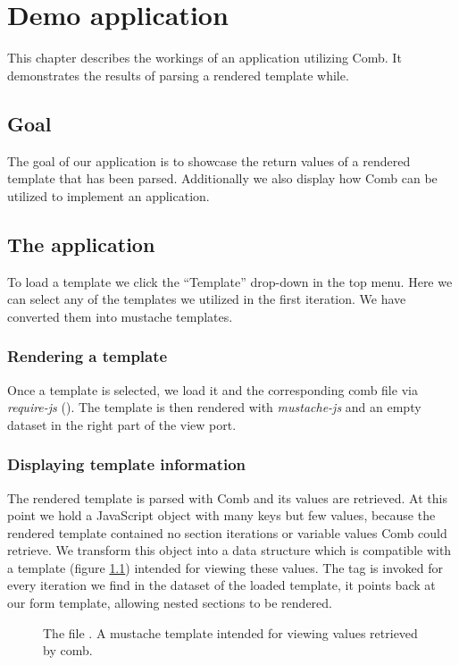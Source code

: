 \documentclass[thesis.tex]{subfiles}
\begin{document}
\chapter{Demo application}
\label{chap:demo}
This chapter describes the workings of an application utilizing Comb.
It demonstrates the results of parsing a rendered template while.

\section{Goal}
The goal of our application is to showcase the return values of a
rendered template that has been parsed.
Additionally we also display how Comb can be utilized to implement an
application.

\section{The application}
To load a template we click the ``Template'' drop-down in the top menu.
Here we can select any of the templates we utilized in the first iteration.
We have converted them into mustache templates.

\subsection{Rendering a template}
Once a template is selected, we load it and the corresponding comb file via
\emph{require-js} (). The template is then rendered with
\emph{mustache-js} and an empty dataset in the right part of the view port.

\subsection{Displaying template information}
The rendered template is parsed with Comb and its values are retrieved.
At this point we hold a JavaScript object with many keys but few values,
because the rendered template contained no section iterations or variable values
Comb could retrieve. We transform this object into a data structure which is
compatible with a template (figure \ref{fig:mustache.mustache}) intended for
viewing these values. The  tag is invoked for every
iteration we find in the dataset of the loaded template, it points back at our
form template, allowing nested sections to be rendered.

\begin{figure}
	\centering
	\caption{
		The file .
		A mustache template intended for viewing values retrieved by comb.}
	\label{fig:mustache.mustache}
	
\end{figure}
\end{document}
